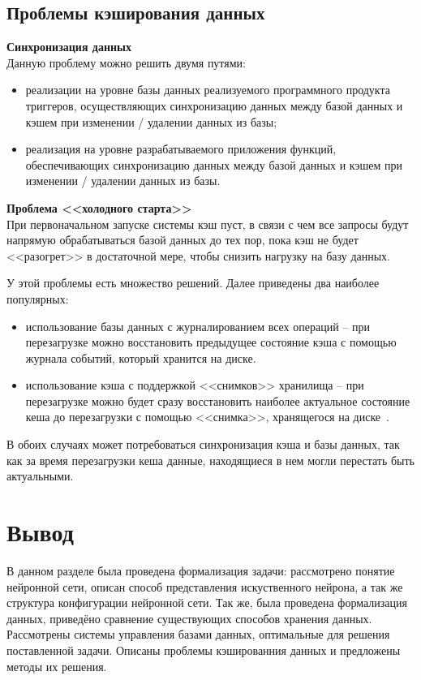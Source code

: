 \subsection{Проблемы кэширования данных}

\noindent\textbf{Синхронизация данных}\\

Данную проблему можно решить двумя путями: 
\begin{itemize}
    \item реализации на уровне базы данных реализуемого программного продукта триггеров,  осуществляющих синхронизацию данных между базой данных и кэшем при изменении / удалении данных из базы;
    \item реализация на уровне разрабатываемого приложения функций, обеспечивающих синхронизацию данных между базой данных и кэшем при изменении / удалении данных из базы.
\end{itemize}

\noindent\textbf{Проблема <<холодного старта>>}\\

При первоначальном запуске системы кэш пуст, в связи с чем все запросы будут напрямую обрабатываться базой данных до тех пор, пока кэш не будет <<разогрет>> в достаточной мере, чтобы снизить нагрузку на базу данных.

У этой проблемы есть множество решений. Далее приведены два наиболее популярных:
\begin{itemize}
    \item использование базы данных с журналированием всех операций -- при перезагрузке можно восстановить предыдущее состояние кэша с помощью журнала событий, который хранится на диске.
    \item использование кэша с поддержкой <<снимков>> хранилища -- при перезагрузке можно будет сразу восстановить наиболее актуальное состояние кеша до перезагрузки с помощью <<снимка>>, хранящегося на диске~\cite{tarantool-snapshots}.
\end{itemize}

В обоих случаях может потребоваться синхронизация кэша и базы данных, так как за время перезагрузки кеша данные, находящиеся в нем могли перестать быть актуальными.

\section*{Вывод}

В данном разделе была проведена формализация задачи: рассмотрено понятие нейронной сети, описан способ представления искуственного нейрона, а так же структура конфигурации нейронной сети. Так же, была проведена формализация данных, приведёно сравнение существующих способов хранения данных. Рассмотрены системы управления базами данных, оптимальные для решения поставленной задачи. Описаны проблемы кэшированния данных и предложены методы их решения.